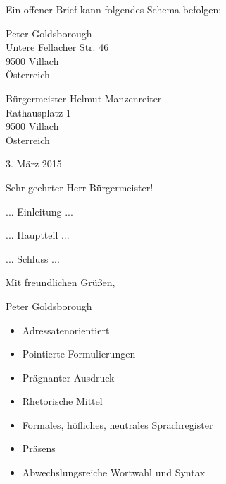 
Ein offener Brief kann folgendes Schema befolgen:

{ \em

Peter Goldsborough\\
Untere Fellacher Str. 46\\
9500 Villach\\
\"{O}sterreich

B\"{u}rgermeister Helmut Manzenreiter\\
Rathausplatz 1\\
9500 Villach\\
\"{O}sterreich
\begin{flushright} 3. M\"{a}rz 2015 \end{flushright}
Sehr geehrter Herr B\"{u}rgermeister!

... Einleitung ...

... Hauptteil ...

... Schluss ...

Mit freundlichen Gr\"{u}\ss{}en,

Peter Goldsborough

} %

\extrapar


\begin{itemize}
	\item Adressatenorientiert
	\item Pointierte Formulierungen
	\item Pr\"{a}gnanter Ausdruck
	\item Rhetorische Mittel
	\item Formales, h\"{o}fliches, neutrales Sprachregister
	\item Pr\"{a}sens
	\item Abwechslungsreiche Wortwahl und Syntax
\end{itemize}

